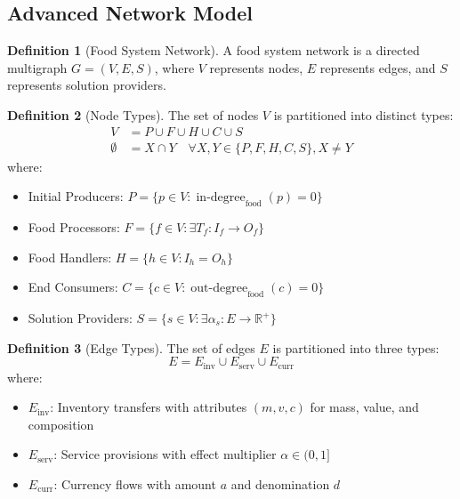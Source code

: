 \documentclass[12pt]{article}
\DeclareMathOperator{\indegree}{in\text{-}degree}
\DeclareMathOperator{\outdegree}{out\text{-}degree}
\theoremstyle{definition}
\newtheorem{definition}{Definition}
\begin{document}
\subsection{Advanced Network Model}
\begin{definition}[Food System Network]
A food system network is a directed multigraph $G = (V, E, S)$, where $V$ represents nodes, $E$ represents edges, and $S$ represents solution providers.
\end{definition}

\begin{definition}[Node Types]
The set of nodes $V$ is partitioned into distinct types:
\begin{align*}
    V &= P \cup F \cup H \cup C \cup S \\
    \emptyset &= X \cap Y \quad \forall X, Y \in \{P,F,H,C,S\}, X \neq Y
\end{align*}
where:
\begin{itemize}
    \item Initial Producers: $P = \{p \in V : \indegree_{\text{food}}(p) = 0\}$
    \item Food Processors: $F = \{f \in V : \exists T_f : I_f \rightarrow O_f\}$
    \item Food Handlers: $H = \{h \in V : I_h = O_h\}$
    \item End Consumers: $C = \{c \in V : \outdegree_{\text{food}}(c) = 0\}$
    \item Solution Providers: $S = \{s \in V : \exists \alpha_s : E \rightarrow \mathbb{R}^+\}$
\end{itemize}
\end{definition}

\begin{definition}[Edge Types]
The set of edges $E$ is partitioned into three types:
\begin{equation}
    E = E_{\text{inv}} \cup E_{\text{serv}} \cup E_{\text{curr}}
\end{equation}
where:
\begin{itemize}
    \item $E_{\text{inv}}$: Inventory transfers with attributes $(m, v, c)$ for mass, value, and composition
    \item $E_{\text{serv}}$: Service provisions with effect multiplier $\alpha \in (0,1]$
    \item $E_{\text{curr}}$: Currency flows with amount $a$ and denomination $d$
\end{itemize}
\end{definition}
\end{document}
